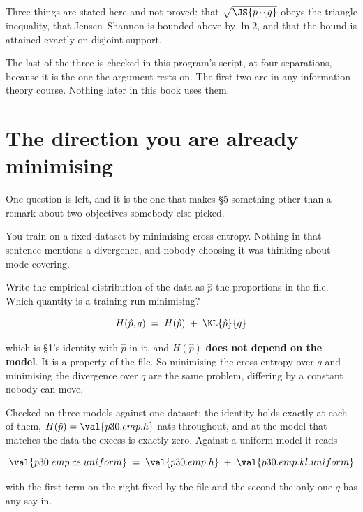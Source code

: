 \begin{fr}
\begin{rigourbox}
Three things are stated here and not proved: that $\sqrt{\JS{p}{q}}$ obeys
the triangle inequality, that Jensen--Shannon is bounded above by $\ln 2$,
and that the bound is attained exactly on disjoint support.

The last of the three is checked in this program's script, at four
separations, because it is the one the argument rests on. The first two are
in any information-theory course. Nothing later in this book uses them.
\end{rigourbox}
\end{fr}

\section{The direction you are already minimising}
\label{sec:P30-empirical}

\begin{fr}
One question is left, and it is the one that makes §5 something other than a
remark about two objectives somebody else picked.

You train on a fixed dataset by minimising cross-entropy. Nothing in that
sentence mentions a divergence, and nobody choosing it was thinking about
mode-covering.

Write the empirical distribution of the data as $\hat p$ \dash{} the
proportions in the file. Which quantity is a training run minimising?
\dotline
\nextframe
\end{fr}

\begin{fr}

\[ H(\hat p, q) \;=\; H(\hat p) \;+\; \KL{\hat p}{q} \]

which is §1's identity with $\hat p$ in it, and $H(\hat p)$ \textbf{does not
depend on the model}. It is a property of the file. So minimising the
cross-entropy over $q$ and minimising the divergence over $q$ are the same
problem, differing by a constant nobody can move.

Checked on three models against one dataset: the identity holds exactly at
each of them, $H(\hat p) = \val{p30.emp.h}$ nats throughout, and at the model
that matches the data the excess is exactly zero. Against a uniform model it
reads

\[ \val{p30.emp.ce.uniform} \;=\; \val{p30.emp.h} \;+\; \val{p30.emp.kl.uniform} \]

with the first term on the right fixed by the file and the second the only
one $q$ has any say in.
\end{fr}

